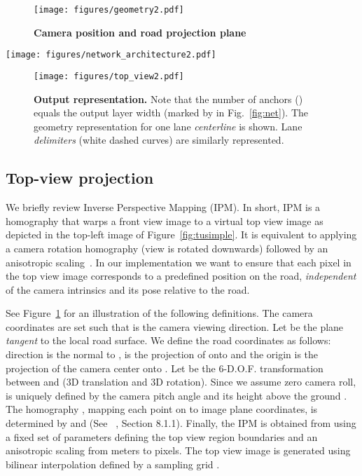 \documentclass[10pt,twocolumn,letterpaper]{article}
\begin{document}
\begin{figure}[t]
	\begin{center}
		\texttt{[image: figures/geometry2.pdf]}
	\end{center}
	\caption{\textbf{Camera position and road projection plane}}
	\label{fig:geometry}
	
\end{figure}


\begin{figure*}[t]
	\begin{center}
		\texttt{[image: figures/network\_architecture2.pdf]} 
	\end{center}
	\caption{\textbf{3D-LaneNet network architecture.}}
	\label{fig:net}
\end{figure*}

\begin{figure}[t]
	\begin{center}
		\texttt{[image: figures/top\_view2.pdf]}
	\end{center}
	\caption{\textbf{Output representation.} Note that the number of anchors () equals the output layer width (marked by  in Fig.~\ref{fig:net}). The geometry representation for one lane \textit{centerline} is shown. Lane \textit{delimiters} (white dashed curves) are similarly represented.}
	\label{fig:out}
\end{figure}

\subsection{Top-view projection}\label{sec:IPM}
We briefly review Inverse Perspective Mapping (IPM). In short, IPM is a homography that warps a front view image to a virtual top view image as depicted in the top-left image of Figure~\ref{fig:tusimple}. It is equivalent to applying a camera rotation homography (view is rotated downwards) followed by an anisotropic scaling~\cite{Hartley2004}. In our implementation we want to ensure that each pixel in the top view image corresponds to a predefined position on the road, \textit{independent} of the camera intrinsics and its pose relative to the road.

See Figure~\ref{fig:geometry} for an illustration of the following definitions. The camera coordinates   are set such that  is the camera viewing direction. Let  be the plane \textit{tangent} to the local road surface. We define the road coordinates  as follows:  direction is the normal to ,  is the projection of  onto  and the origin is the projection of the camera center onto . Let  be the 6-D.O.F. transformation between  and   (3D translation and 3D rotation). Since we assume zero camera roll,  is uniquely defined by the camera pitch angle  and its height above the ground . The homography , mapping each point on  to image plane coordinates, is determined by  and  (See ~\cite{Hartley2004}, Section 8.1.1). Finally, the IPM is obtained from  using a fixed set of parameters   defining the top view region boundaries and an anisotropic scaling from meters to pixels. The top view image is generated using bilinear interpolation defined by a sampling grid . 
\end{document}
